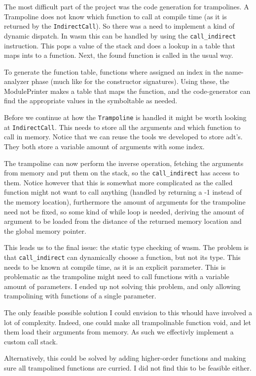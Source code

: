 The most difficult part of the project was the code generation for trampolines. A Trampoline does not know which function to call at compile time (as it is returned by the \texttt{IndirectCall}). So there was a need to implement a kind of dynamic dispatch. In wasm this can be handled by using the \texttt{call\_indirect} instruction. This pops a value of the stack and does a lookup in a table that maps ints to a function. Next, the found function is called in the usual way.

To generate the function table, functions where assigned an index in the name-analyzer phase (much like for the constructor signatures). Using these, the ModulePrinter makes a table that maps the function, and the code-generator can find the appropriate values in the symboltable as needed.

Before we continue at how the \texttt{Trampoline} is handled it might be worth looking at \texttt{IndirectCall}. This needs to store all the arguments and which function to call in memory. Notice that we can reuse the tools we developed to store adt's. They both store a variable amount of arguments with some index.

The trampoline can now perform the inverse operation, fetching the arguments from memory and put them on the stack, so the \texttt{call\_indirect} has access to them. Notice however that this is somewhat more complicated as the called function might not want to call anything (handled by returning a -1 instead of the memory location), furthermore the amount of arguments for the trampoline need not be fixed, so some kind of while loop is needed, deriving the amount of argument to be loaded from the distance of the returned memory location and the global memory pointer.

This leads us to the final issue: the static type checking of wasm. The problem is that \texttt{call\_indirect} can dynamically choose a function, but not its type. This needs to be known at compile time, as it is an explicit parameter. This is problematic as the trampoline might need to call functions with a variable amount of parameters. I ended up not solving this problem, and only allowing trampolining with functions of a single parameter.

The only feasible possible solution I could envision to this whould have involved a lot of complexity. Indeed, one could make all trampolinable function void, and let them load their arguments from memory. As such we effectivly implement a custom call stack.

Alternatively, this could be solved by adding higher-order functions and making sure all trampolined functions are curried. I did not find this to be feasible either.
